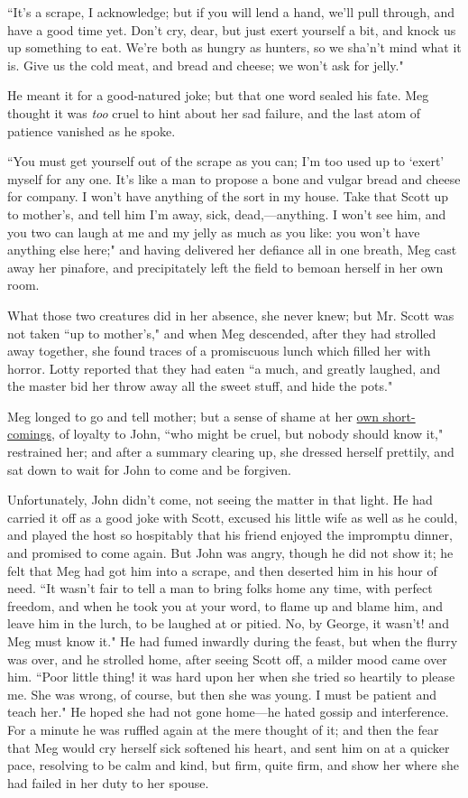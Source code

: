 ``It's a scrape, I acknowledge; but if you will lend a
hand, we'll pull through, and have a good time yet.
Don't cry, dear, but just exert yourself a bit, and
knock us up something to eat. We're both as hungry as
hunters, so we sha'n't mind what it is.
Give us the cold meat, and bread and cheese; we won't
ask for jelly."

He meant it for a good-natured joke; but that one word sealed his fate.
Meg thought it was \emph{too} cruel to hint about her sad failure, and
the last atom of patience vanished as he spoke.

``You must get yourself out of the scrape as you can; I'm
too used up to `exert' myself for any
one. It's like a man to propose a bone and vulgar bread
and cheese for company. I won't have anything of the
sort in my house. Take that Scott up to mother's, and
tell him I'm away, sick, dead,---anything. I
won't see him, and you two can laugh at me and my jelly
as much as you like: you won't have anything else here;"
and having delivered her defiance all in one breath, Meg cast away her
pinafore, and precipitately left the field to bemoan herself in her own
room.

What those two creatures did in her absence, she never knew; but Mr.
Scott was not taken ``up to mother's," and when Meg
descended, after they had strolled away together, she found traces of a
promiscuous lunch which filled her with horror. Lotty reported that they
had eaten ``a much, and greatly laughed, and the master bid her throw
away all the sweet stuff, and hide the pots."

Meg longed to go and tell mother; but a sense of shame at her \underline{own
short-comings,} of loyalty to John, ``who might be cruel, but nobody
should know it," restrained her; and after a summary clearing up, she
dressed herself prettily, and sat down to wait for John to come and be
forgiven.

Unfortunately, John didn't come, not seeing the matter
in that light. He had carried it off as a good joke with Scott, excused
his little wife as well as he could, and played the host so hospitably
that his friend enjoyed the impromptu dinner, and promised to come
again. But John was angry, though he did not show it; he felt that Meg
had got him into a scrape, and then deserted him in his hour of need.
``It wasn't fair to tell a man to bring folks home any
time, with perfect freedom, and when he took you at your word, to flame
up and blame him, and leave him in the lurch, to be laughed at or
pitied. No, by George, it wasn't! and Meg must know it."
He had fumed inwardly during the feast, but when the flurry was over,
and he strolled home, after seeing Scott off, a milder mood came over
him. ``Poor little thing! it was hard upon her when she tried so heartily
to please me. She was wrong, of course, but then she was young. I must
be patient and teach her." He hoped she had not gone home---he hated
gossip and interference. For a minute he was ruffled again at the mere
thought of it; and then the fear that Meg would cry herself sick
softened his heart, and sent him on at a quicker pace, resolving to be
calm and kind, but firm, quite firm, and show her where she had failed
in her duty to her spouse.

